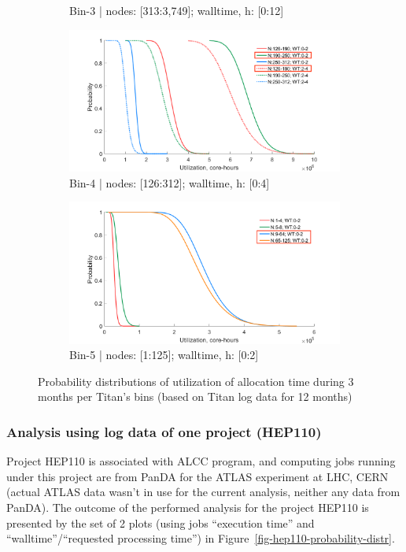 \begin{figure}
\begin{subfigure}{.5\textwidth}
        \caption{Bin-3 | nodes: [313:3,749]; walltime, h: [0:12]}
    \end{subfigure}
    \begin{subfigure}{.5\textwidth}
        \centering
        \includegraphics[width=.83\linewidth]{pics/proj-all-probability-distr-bin4.png}
        \caption{Bin-4 | nodes: [126:312]; walltime, h: [0:4]}
    \end{subfigure}
    \begin{subfigure}{.5\textwidth}
        \centering
        \includegraphics[width=.83\linewidth]{pics/proj-all-probability-distr-bin5.png}
        \caption{Bin-5 | nodes: [1:125]; walltime, h: [0:2]}
    \end{subfigure}
    \caption{Probability distributions of utilization of allocation time during 3 months per Titan's bins (based on Titan log data for 12 months)}
    \label{fig-proj-all-probability-distr}
\end{figure}

\subsubsection{Analysis using log data of one project (HEP110)} \label{sec-experiments-3-2}

Project HEP110 is associated with ALCC program, and computing jobs running under this project are from PanDA for the ATLAS experiment at LHC, CERN (actual ATLAS data wasn't in use for the current analysis, neither any data from PanDA). The outcome of the performed analysis for the project HEP110 is presented by the set of 2 plots (using jobs ``execution time'' and ``walltime''/``requested processing time'') in Figure~\ref{fig-hep110-probability-distr}.

